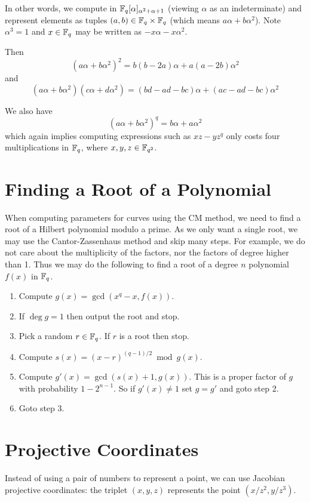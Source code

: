 In other words, we compute in $\mathbb{F}_q[\alpha]_{\alpha^2+\alpha+1}$
(viewing $\alpha$ as an indeterminate) and represent elements
as tuples $(a,b) \in \mathbb{F}_q \times \mathbb{F}_q$ (which means $a \alpha + b \alpha^2$).
Note $\alpha^3 = 1$ and $x\in\mathbb{F}_q$ may be written as $-x \alpha - x\alpha^2$.

Then
\[ (a \alpha + b \alpha^2)^2 = b(b-2a)\alpha + a(a-2b)\alpha^2 \]
and
\[ (a \alpha + b \alpha^2)(c \alpha + d \alpha^2) =
(bd-ad-bc)\alpha + (ac-ad-bc)\alpha^2 \]

We also have
\[ (a\alpha + b\alpha^2)^q = b\alpha + a\alpha^2 \]
which again implies computing expressions such as $x z - y z^q$ only
costs four multiplications in $\mathbb{F}_q$, where $x,y,z \in \mathbb{F}_{q^2}$.

\section{\label{sec:rootfinding}Finding a Root of a Polynomial}

When computing parameters for curves using the CM method, we
need to find a root of a Hilbert polynomial modulo a prime.
As we only want a single root, we may use the Cantor-Zassenhaus
method and skip many steps. For example, we do not care about
the multiplicity of the factors, nor the factors of degree higher than 1.
Thus we may do the following to find a root of a
degree $n$ polynomial $f(x)$ in
$\mathbb{F}_q$.

\begin{enumerate}
\item
Compute $g(x) = \gcd(x^q - x, f(x))$.
\item
If $\deg g = 1$ then output the root and stop.
\item
Pick a random $r \in \mathbb{F}_q$. If $r$ is a root then stop.
\item
Compute $s(x) = (x-r)^{(q-1)/2} \bmod g(x)$.
\item
Compute $g'(x) = \gcd(s(x)+1, g(x))$. This is a proper factor of $g$
with probability $1 - 2^{n-1}$. So if $g'(x) \ne 1$ set $g = g'$ and
goto step 2.
\item
Goto step 3.
\end{enumerate}

\section {\label{sec:projcoord}Projective Coordinates}

Instead of using a pair of numbers to represent a point,
we can use Jacobian projective coordinates: the triplet
$(x,y,z)$ represents the point $(x/z^2, y/z^3)$.

